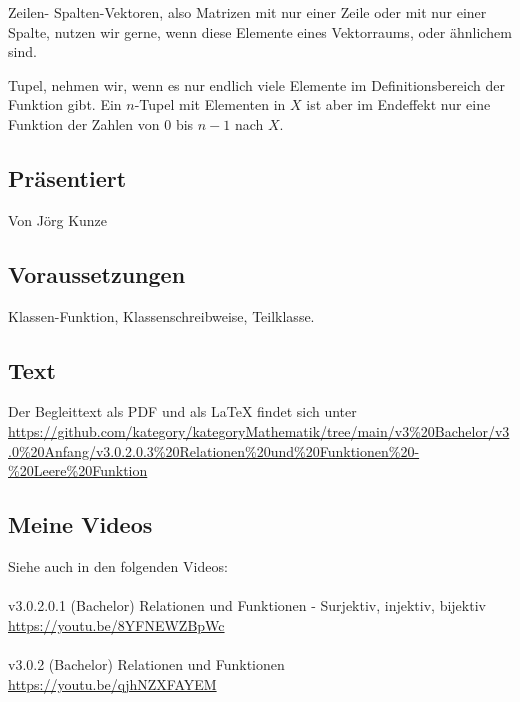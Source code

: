 \documentclass[a4paper]{amsart}
\theoremstyle{definition}
\begin{document}
Zeilen- Spalten-Vektoren, also Matrizen mit nur einer Zeile oder mit nur einer Spalte, nutzen wir gerne, wenn diese Elemente eines Vektorraums, oder ähnlichem sind.

Tupel, nehmen wir, wenn es nur endlich viele Elemente im Definitionsbereich der Funktion gibt. Ein $n$-Tupel  mit Elementen in $X$ ist aber im Endeffekt nur eine Funktion der Zahlen von $0$ bis $n-1$ nach $X$.

\subsection*{Präsentiert}
Von Jörg Kunze

\subsection*{Voraussetzungen}
Klassen-Funktion, Klassenschreibweise, Teilklasse.

\subsection*{Text}
Der Begleittext als PDF und als LaTeX findet sich unter
{\tiny
   \url{https://github.com/kategory/kategoryMathematik/tree/main/v3%20Bachelor/v3.0%20Anfang/v3.0.2.0.3%20Relationen%20und%20Funktionen%20-%20Leere%20Funktion}
}

\subsection*{Meine Videos}
Siehe auch in den folgenden Videos:\\
\\
v3.0.2.0.1 (Bachelor) Relationen und Funktionen - Surjektiv, injektiv, bijektiv\\
\url{https://youtu.be/8YFNEWZBpWc}\\
\\
v3.0.2 (Bachelor) Relationen und Funktionen\\
\url{https://youtu.be/qjhNZXFAYEM}
\end{document}
